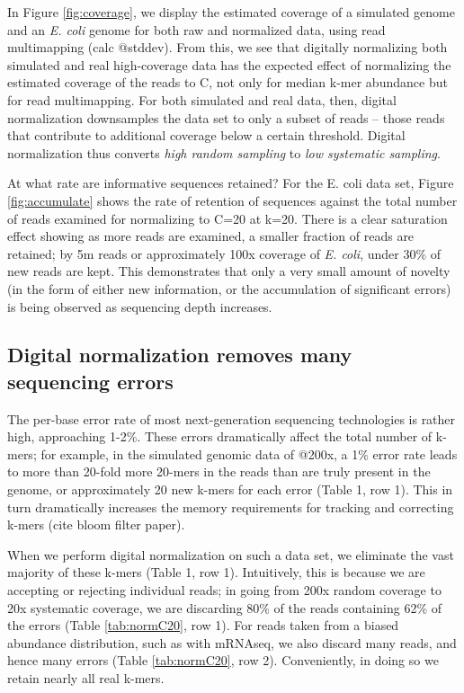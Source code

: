 \documentclass[10pt]{article}
\begin{document}
In Figure \ref{fig:coverage}, we display the estimated coverage of a
simulated genome and an {\em E. coli} genome for both raw and
normalized data, using read multimapping (calc @stddev).  From this,
we see that digitally normalizing both simulated and real
high-coverage data has the expected effect of normalizing the
estimated coverage of the reads to C, not only for median k-mer
abundance but for read multimapping.  For both simulated and real
data, then, digital normalization downsamples the data set to only a
subset of reads -- those reads that contribute to additional coverage
below a certain threshold.  Digital normalization thus converts {\em
  high random sampling} to {\em low systematic sampling}.

At what rate are informative sequences retained?  For the E. coli data
set, Figure \ref{fig:accumulate} shows the rate of retention of
sequences against the total number of reads examined for normalizing
to C=20 at k=20.  There is a clear saturation effect showing as more
reads are examined, a smaller fraction of reads are retained; by 5m
reads or approximately 100x coverage of {\em E. coli}, under 30\% of
new reads are kept.  This demonstrates that only a very small amount
of novelty (in the form of either new information, or the accumulation
of significant errors) is being observed as sequencing depth increases.

\subsection*{Digital normalization removes many sequencing errors}

The per-base error rate of most next-generation sequencing technologies
is rather high, approaching 1-2\%.  
These
errors dramatically affect the total number of k-mers; for example, in the
simulated genomic data of @200x, a 1\% error rate leads to more than
20-fold more 20-mers in the reads than are truly present in the genome,
or approximately 20 new k-mers for each error (Table 1, row 1).
This in turn dramatically increases the memory requirements for
tracking and correcting k-mers (cite bloom filter paper).

When we perform digital normalization on such a data set, we eliminate
the vast majority of these k-mers (Table 1, row 1).  Intuitively, this is
because we are accepting or rejecting individual reads; in going from
200x random coverage to 20x systematic coverage, we are discarding
80\% of the reads containing 62\% of the errors (Table \ref{tab:normC20}, row 1).
For reads taken from a biased abundance distribution, such as with
mRNAseq, we also discard many reads, and hence many errors (Table \ref{tab:normC20}, row 2).
Conveniently, in doing so we retain nearly all real k-mers.
\end{document}
